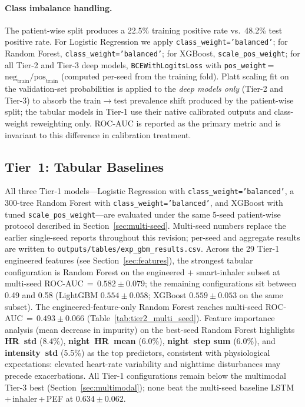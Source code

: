 \documentclass[11pt,a4paper]{article}
\begin{document}
\paragraph{Class imbalance handling.}
The patient-wise split produces a 22.5\% training positive rate vs.\
48.2\% test positive rate.  For Logistic Regression we apply
\texttt{class\_weight='balanced'}; for Random Forest,
\texttt{class\_weight='balanced'}; for XGBoost,
\texttt{scale\_pos\_weight}; for all Tier-2 and Tier-3 deep models,
\texttt{BCEWithLogitsLoss} with
\texttt{pos\_weight}\,=\,$\text{neg}_\text{train}/\text{pos}_\text{train}$
(computed per-seed from the training fold).  Platt scaling fit on the
validation-set probabilities is applied to the \emph{deep models only}
(Tier-2 and Tier-3) to absorb the train$\to$test prevalence shift
produced by the patient-wise split; the tabular models in Tier-1 use
their native calibrated outputs and class-weight reweighting only.
ROC-AUC is reported as the primary metric and is invariant to this
difference in calibration treatment.

\subsection{Tier~1: Tabular Baselines}\label{sec:tier1}

All three Tier-1 models---Logistic Regression with
\texttt{class\_weight='balanced'}, a 300-tree Random Forest with
\texttt{class\_weight='balanced'}, and XGBoost with tuned
\texttt{scale\_pos\_weight}---are evaluated under the same 5-seed
patient-wise protocol described in Section~\ref{sec:multi-seed}.
Multi-seed numbers replace the earlier single-seed reports throughout this
revision; per-seed and aggregate results are written to
\texttt{outputs/tables/exp\_gbm\_results.csv}.  Across the 29 Tier-1
engineered features (see Section~\ref{sec:features}), the strongest
tabular configuration is Random Forest on the engineered
$+$ smart-inhaler subset at multi-seed ROC-AUC\,$=\,0.582\pm0.079$; the
remaining configurations sit between 0.49 and 0.58 (LightGBM
$0.554\pm0.058$; XGBoost $0.559\pm0.053$ on the same subset).  The
engineered-feature-only Random Forest reaches multi-seed
ROC-AUC\,$=\,0.493\pm0.066$ (Table~\ref{tab:tier2_multi_seed}).  Feature
importance analysis (mean decrease in impurity) on the best-seed Random
Forest highlights \textbf{HR~std} (8.4\%), \textbf{night~HR~mean} (6.0\%),
\textbf{night~step sum} (6.0\%), and \textbf{intensity~std} (5.5\%) as the
top predictors, consistent with physiological expectations: elevated
heart-rate variability and nighttime disturbances may precede
exacerbations.  All Tier-1 configurations remain below the multimodal
Tier-3 best (Section~\ref{sec:multimodal}); none beat the multi-seed
baseline LSTM\,+\,inhaler\,+\,PEF at $0.634\pm0.062$.
\end{document}
